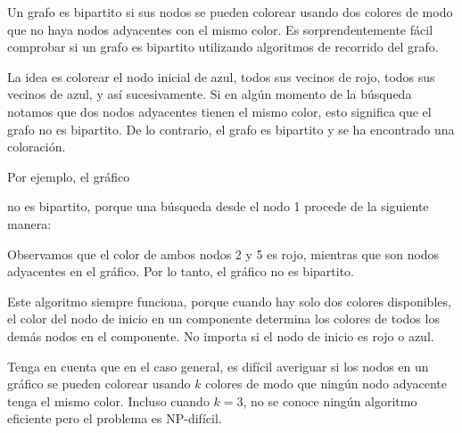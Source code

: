 
Un grafo es bipartito si sus nodos se pueden colorear
usando dos colores de modo que no haya nodos adyacentes
con el mismo color.
Es sorprendentemente fácil comprobar si un grafo
es bipartito utilizando algoritmos de recorrido del grafo.

La idea es colorear el nodo inicial de azul,
todos sus vecinos de rojo, todos sus vecinos de azul, y así sucesivamente.
Si en algún momento de la búsqueda notamos que
dos nodos adyacentes tienen el mismo color,
esto significa que el grafo no es bipartito.
De lo contrario, el grafo es bipartito y se ha encontrado una coloración.


Por ejemplo, el gráfico
\begin{center}
\end{center}
no es bipartito, porque una búsqueda desde el nodo 1
procede de la siguiente manera:
\begin{center}
\end{center}
Observamos que el color de ambos nodos 2 y 5
es rojo, mientras que son nodos adyacentes en el gráfico.
Por lo tanto, el gráfico no es bipartito.

Este algoritmo siempre funciona, porque cuando hay
solo dos colores disponibles,
el color del nodo de inicio en un componente
determina los colores de todos los demás nodos en el componente.
No importa si el
nodo de inicio es rojo o azul.

Tenga en cuenta que en el caso general,
es difícil averiguar si los nodos
en un gráfico se pueden colorear usando $k$ colores
de modo que ningún nodo adyacente tenga el mismo color.
Incluso cuando $k=3$, no se conoce ningún algoritmo eficiente
pero el problema es NP-difícil.

